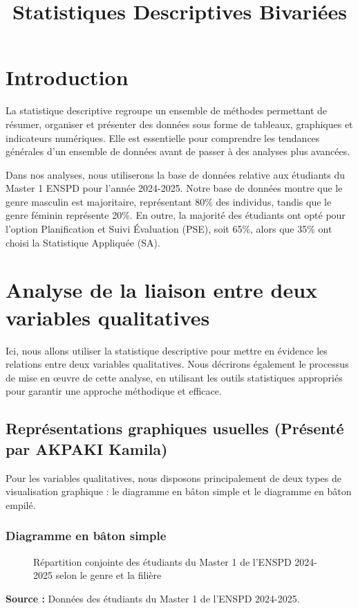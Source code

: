 \documentclass[a4paper,12pt]{article}
\begin{document}
\title{Statistiques Descriptives Bivariées}
\author{}
\date{}
\maketitle

\section{Introduction}
La statistique descriptive regroupe un ensemble de méthodes permettant de résumer, organiser et présenter des données sous forme de tableaux, graphiques et indicateurs numériques. Elle est essentielle pour comprendre les tendances générales d'un ensemble de données avant de passer à des analyses plus avancées.

Dans nos analyses, nous utiliserons la base de données relative aux étudiants du Master 1 ENSPD pour l'année 2024-2025. Notre base de données montre que le genre masculin est majoritaire, représentant 80\% des individus, tandis que le genre féminin représente 20\%. En outre, la majorité des étudiants ont opté pour l'option Planification et Suivi Évaluation (PSE), soit 65\%, alors que 35\% ont choisi la Statistique Appliquée (SA).

\section{Analyse de la liaison entre deux variables qualitatives}
Ici, nous allons utiliser la statistique descriptive pour mettre en évidence les relations entre deux variables qualitatives. Nous décrirons également le processus de mise en œuvre de cette analyse, en utilisant les outils statistiques appropriés pour garantir une approche méthodique et efficace.

\subsection{Représentations graphiques usuelles (Présenté par AKPAKI Kamila)}
Pour les variables qualitatives, nous disposons principalement de deux types de visualisation graphique : le diagramme en bâton simple et le diagramme en bâton empilé.

\subsubsection{Diagramme en bâton simple}
\begin{figure}[h]
    \centering

    \caption{Répartition conjointe des étudiants du Master 1 de l’ENSPD 2024-2025 selon le genre et la filière}
    \label{fig:baton_simple}
\end{figure}
\textbf{Source :} Données des étudiants du Master 1 de l’ENSPD 2024-2025.
\end{document}
